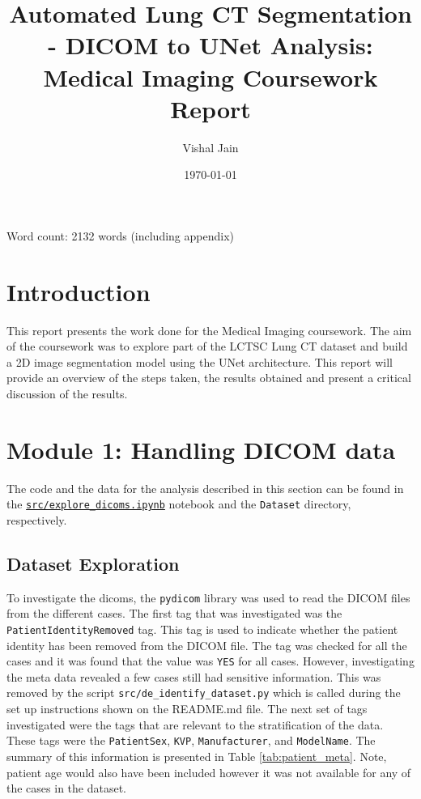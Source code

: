 \documentclass[11pt]{article}
\title{Automated Lung CT Segmentation -  DICOM to UNet Analysis: Medical Imaging Coursework Report}
\author{Vishal Jain}
\date{\today}
\begin{document}
\maketitle

\tableofcontents
Word count: 2132 words (including appendix)
\newpage

\section{Introduction}
This report presents the work done for the Medical Imaging coursework. The aim of the coursework was to explore part of the LCTSC Lung CT dataset and build a 2D image segmentation model using the UNet architecture. This report will provide an overview of the steps taken, the results obtained and present a critical discussion of the results.

\section{Module 1: Handling DICOM data}
The code and the data for the analysis described in this section can be found in the \texttt{\url{src/explore_dicoms.ipynb}} notebook and the \texttt{Dataset} directory, respectively.

\subsection{Dataset Exploration}
To investigate the dicoms, the \texttt{pydicom} library was used to read the DICOM files from the different cases. The first tag that was investigated was the \texttt{PatientIdentityRemoved} tag. This tag is used to indicate whether the patient identity has been removed from the DICOM file. The tag was checked for all the cases and it was found that the value was \texttt{YES} for all cases. However, investigating the meta data revealed a few cases still had sensitive information. This was removed by the script \texttt{src/de\_identify\_dataset.py} which is called during the set up instructions shown on the README.md file. The next set of tags investigated were the tags that are relevant to the stratification of the data. These tags were the \texttt{PatientSex}, \texttt{KVP}, \texttt{Manufacturer}, and \texttt{ModelName}. The summary of this information is presented in Table \ref{tab:patient_meta}. Note, patient age would also have been included however it was not available for any of the cases in the dataset.
\end{document}
